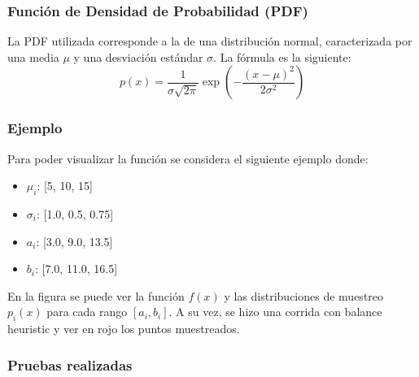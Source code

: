\documentclass{article}
\begin{document}
\subsubsection{Función de Densidad de Probabilidad (PDF)}
La PDF utilizada corresponde a la de una distribución normal, caracterizada por una media \( \mu \) y una desviación estándar \( \sigma \). La fórmula es la siguiente:
\begin{equation}
p(x) = \frac{1}{\sigma \sqrt{2\pi}} \exp\left(-\frac{(x - \mu)^2}{2\sigma^2}\right)
\end{equation}

\subsubsection{Ejemplo}

Para poder visualizar la función se considera el siguiente ejemplo donde:

\begin{itemize}
    \item \textbf{\( \mu_{i} \)}: [5, 10, 15]
    \item \textbf{\( \sigma_{i} \)}: [1.0, 0.5, 0.75]
    \item \textbf{\( a_{i} \)}: [3.0, 9.0, 13.5]
    \item \textbf{\( b_{i} \)}: [7.0, 11.0, 16.5]
\end{itemize}

En la figura se puede ver la función \( f(x) \) y las distribuciones de muestreo \( p_{i}(x) \) para cada rango \( [a_{i}, b_{i}] \).
A su vez, se hizo una corrida con balance heuristic y ver en rojo los puntos muestreados.

\subsubsection{Pruebas realizadas}
\end{document}
